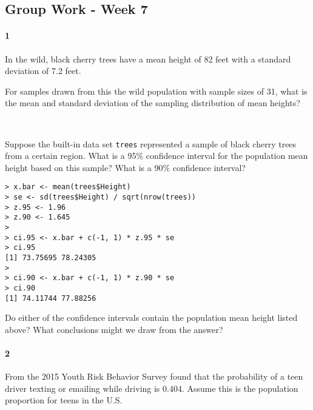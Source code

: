 \documentclass{article}
\begin{document}
\begin{flushleft}
\section*{Group Work - Week 7}
\paragraph{1} In the wild, black cherry trees have a mean height of 82 feet with a standard deviation of 7.2 feet. 
\begin{enumalpha}
\item For samples drawn from this the wild population with sample sizes of 31, what is the mean and standard deviation of the sampling distribution of mean heights?\\
\medskip

\\
\smallskip
{}

\vspace{0.5in}
\item Suppose the built-in data set \verb+trees+ represented a sample of black cherry trees from a certain region. What is a 95\% confidence interval for the population mean height based on this sample? What is a 90\% confidence interval? 

\begin{verbatim}
> x.bar <- mean(trees$Height)
> se <- sd(trees$Height) / sqrt(nrow(trees))
> z.95 <- 1.96
> z.90 <- 1.645
> 
> ci.95 <- x.bar + c(-1, 1) * z.95 * se
> ci.95
[1] 73.75695 78.24305
> 
> ci.90 <- x.bar + c(-1, 1) * z.90 * se
> ci.90
[1] 74.11744 77.88256
\end{verbatim}

\vspace{0.5in}

\item Do either of the confidence intervals contain the population mean height listed above? What conclusions might we draw from the answer?\\
\medskip


\end{enumalpha}

\newpage

\paragraph{2} From the 2015 Youth Risk Behavior Survey found that the probability of a teen driver texting or emailing while driving is 0.404. Assume this is the population proportion for teens in the U.S.


\end{flushleft}
\end{document}
